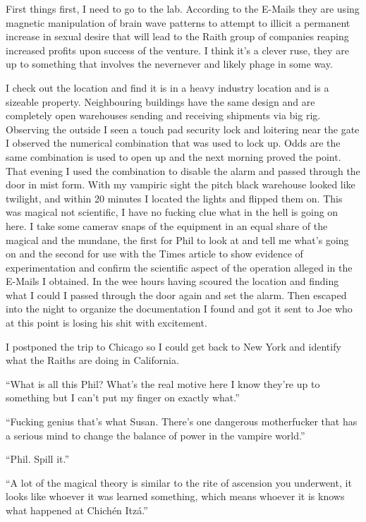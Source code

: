 First things first, I need to go to the lab. According to the E-Mails they are using magnetic manipulation of brain wave patterns to attempt to illicit a permanent increase in sexual desire that will lead to the Raith group of companies reaping increased profits upon success of the venture. I think it's a clever ruse, they are up to something that involves the nevernever and likely phage in some way.

I check out the location and find it is in a heavy industry location and is a sizeable property. Neighbouring buildings have the same design and are completely open warehouses sending and receiving shipments via big rig. Observing the outside I seen a touch pad security lock and loitering near the gate I observed the numerical combination that was used to lock up. Odds are the same combination is used to open up and the next morning proved the point. That evening I used the combination to disable the alarm and passed through the door in mist form. With my vampiric sight the pitch black warehouse looked like twilight, and within 20 minutes I located the lights and flipped them on. This was magical not scientific, I have no fucking clue what in the hell is going on here. I take some camerav snaps of the equipment in an equal share of the magical and the mundane, the first for Phil to look at and tell me what's going on and the second for use with the Times article to show evidence of experimentation and confirm the scientific aspect of the operation alleged in the E-Mails I obtained. In the wee hours having scoured the location and finding what I could I passed through the door again and set the alarm. Then escaped into the night to organize the documentation I found and got it sent to Joe who at this point is losing his shit with excitement.

I postponed the trip to Chicago so I could get back to New York and identify what the Raiths are doing in California.

``What is all this Phil? What's the real motive here I know they're up to something but I can't put my finger on exactly what.''

``Fucking genius that's what Susan. There's one dangerous motherfucker that has a serious mind to change the balance of power in the vampire world.''

``Phil. Spill it.''

``A lot of the magical theory is similar to the rite of ascension you underwent, it looks like whoever it was learned something, which means whoever it is knows what happened at Chich\'{e}n Itz\'{a}.''


